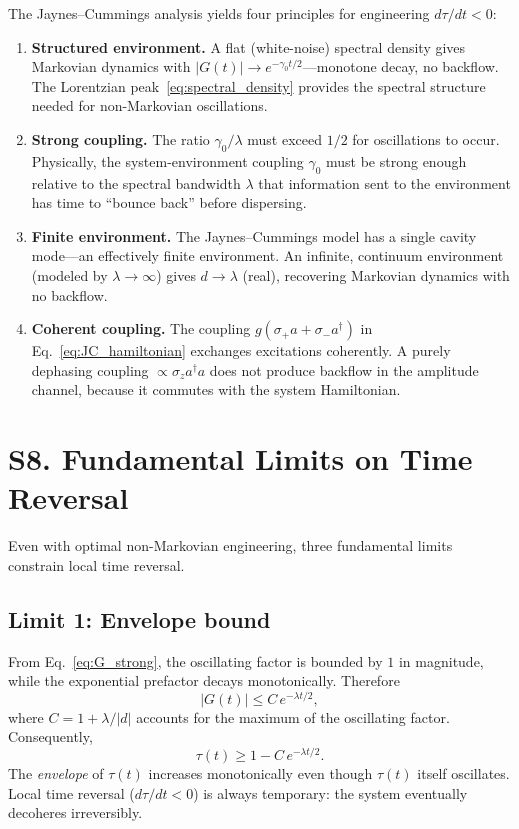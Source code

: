 \documentclass[prl,twocolumn,superscriptaddress,longbibliography]{revtex4-2}
\newcommand{\tauasym}{\tau}
\begin{document}
The Jaynes--Cummings analysis yields four principles for engineering
$d\tauasym/dt < 0$:

\begin{enumerate}
\item \textbf{Structured environment.}
A flat (white-noise) spectral density gives Markovian dynamics
with $|G(t)| \to e^{-\gamma_0 t/2}$---monotone decay, no backflow.
The Lorentzian peak~\eqref{eq:spectral_density} provides the
spectral structure needed for non-Markovian oscillations.

\item \textbf{Strong coupling.}
The ratio $\gamma_0/\lambda$ must exceed $1/2$ for oscillations to
occur.  Physically, the system-environment coupling $\gamma_0$ must
be strong enough relative to the spectral bandwidth $\lambda$ that
information sent to the environment has time to ``bounce back''
before dispersing.

\item \textbf{Finite environment.}
The Jaynes--Cummings model has a single cavity mode---an
effectively finite environment.  An infinite, continuum environment
(modeled by $\lambda \to \infty$) gives $d \to \lambda$ (real),
recovering Markovian dynamics with no backflow.

\item \textbf{Coherent coupling.}
The coupling $g(\sigma_+ a + \sigma_- a^\dagger)$ in
Eq.~\eqref{eq:JC_hamiltonian} exchanges excitations coherently.
A purely dephasing coupling $\propto \sigma_z a^\dagger a$ does
not produce backflow in the amplitude channel, because it commutes
with the system Hamiltonian.
\end{enumerate}

\section{S8. Fundamental Limits on Time Reversal}
\label{sec:limits}

Even with optimal non-Markovian engineering, three fundamental limits
constrain local time reversal.

\subsection{Limit 1: Envelope bound}

From Eq.~\eqref{eq:G_strong}, the oscillating factor is bounded by
$1$ in magnitude, while the exponential prefactor decays
monotonically.  Therefore
\begin{equation}
|G(t)| \leq C\, e^{-\lambda t/2},
\label{eq:envelope}
\end{equation}
where $C = 1 + \lambda/|d|$ accounts for the maximum of the
oscillating factor.  Consequently,
\begin{equation}
\tauasym(t) \geq 1 - C\, e^{-\lambda t/2}.
\end{equation}
The \emph{envelope} of $\tauasym(t)$ increases monotonically
even though $\tauasym(t)$ itself oscillates.  Local time reversal
($d\tauasym/dt < 0$) is always temporary: the system eventually
decoheres irreversibly.
\end{document}
